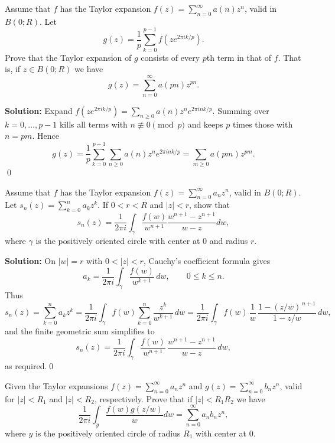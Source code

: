 \begin{problembox}
Assume that \( f \) has the Taylor expansion \( f(z) = \sum_{n=0}^{\infty} a(n)z^n \), valid in \( B(0; R) \). Let
\[g(z) = \frac{1}{p} \sum_{k=0}^{p-1} f(ze^{2\pi ik/p}).\]
Prove that the Taylor expansion of \( g \) consists of every \( p \)th term in that of \( f \). That is, if \( z \in B(0; R) \) we have
\[g(z) = \sum_{n=0}^{\infty} a(pn)z^{pn}.\]
\end{problembox}

\bigskip\noindent\textbf{Solution:}
Expand $f(ze^{2\pi ik/p})=\sum_{n\ge0} a(n) z^n e^{2\pi i n k/p}$. Summing over $k=0,\dots,p-1$ kills all terms with $n\not\equiv0\pmod p$ and keeps $p$ times those with $n=pm$. Hence
\[g(z)=\frac1p\sum_{k=0}^{p-1}\sum_{n\ge0} a(n)z^n e^{2\pi i nk/p}=\sum_{m\ge0}a(pm) z^{pm}.\]\qed


\begin{problembox}
Assume that \( f \) has the Taylor expansion \( f(z) = \sum_{n=0}^{\infty} a_n z^n \), valid in \( B(0; R) \). Let \( s_n(z) = \sum_{k=0}^{n} a_k z^k \). If \( 0 < r < R \) and \( |z| < r \), show that
\[ s_n(z) = \frac{1}{2\pi i} \int_\gamma \frac{f(w)}{w^{n+1}} \frac{w^{n+1} -z^{n+1}}{w - z} dw, \]
where \( \gamma \) is the positively oriented circle with center at 0 and radius \( r \).
\end{problembox}

\bigskip\noindent\textbf{Solution:}
On $|w|=r$ with $0<|z|<r$, Cauchy's coefficient formula gives
\[a_k=\frac{1}{2\pi i}\int_\gamma \frac{f(w)}{w^{k+1}}\,dw,\qquad 0\le k\le n.\]
Thus
\[ s_n(z)=\sum_{k=0}^n a_k z^k=\frac{1}{2\pi i}\int_\gamma f(w)\sum_{k=0}^n \frac{z^k}{w^{k+1}}\,dw
=\frac{1}{2\pi i}\int_\gamma f(w)\,\frac{1}{w}\,\frac{1-(z/w)^{\,n+1}}{1-z/w}\,dw,\]
and the finite geometric sum simplifies to
\[ s_n(z)=\frac{1}{2\pi i}\int_\gamma \frac{f(w)}{w^{n+1}}\,\frac{w^{n+1}-z^{n+1}}{w-z}\,dw, \]
as required.\qed


\begin{problembox}
Given the Taylor expansions \( f(z) = \sum_{n=0}^{\infty} a_n z^n \) and \( g(z) = \sum_{n=0}^{\infty} b_n z^n \), valid for \( |z| < R_1 \) and \( |z| < R_2 \), respectively. Prove that if \( |z| < R_1 R_2 \) we have
\[ \frac{1}{2\pi i} \int_y \frac{f(w) g(z/w)}{w} dw = \sum_{n=0}^{\infty} a_n b_n z^n, \]
where \( y \) is the positively oriented circle of radius \( R_1 \) with center at 0.
\end{problembox}

